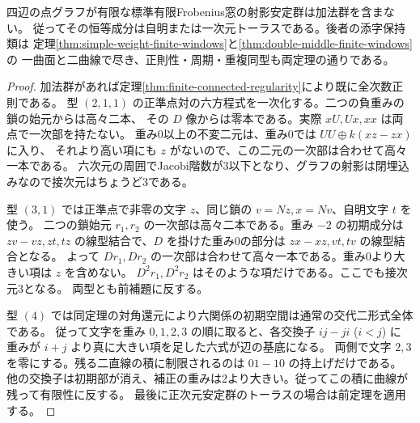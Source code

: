\begin{theorem}\label{thm:finite-no-additive}
四辺の点グラフが有限な標準有限Frobenius窓の射影安定群は加法群を含まない。
従ってその恒等成分は自明または一次元トーラスである。後者の添字保持類は
定理\ref{thm:simple-weight-finite-windows}と\ref{thm:double-middle-finite-windows}の
一曲面と二曲線で尽き、正則性・周期・重複同型も両定理の通りである。
\end{theorem}
\begin{proof}
加法群があれば定理\ref{thm:finite-connected-regularity}により既に全次数正則である。
型 $(2,1,1)$ の正準点対の六方程式を一次化する。二つの負重みの鎖の始元からは高々二本、
その $D$ 像からは零本である。実際 $xU,Ux,xx$ は両点で一次部を持たない。
重み0以上の不変二元は、重み0では $UU\oplus k(xz-zx)$ に入り、
それより高い項にも $z$ がないので、この二元の一次部は合わせて高々一本である。
六次元の周囲でJacobi階数が3以下となり、グラフの射影は閉埋込みなので接次元はちょうど3である。

型 $(3,1)$ では正準点で非零の文字 $z$、同じ鎖の $v=Nz,x=Nv$、自明文字 $t$ を使う。
二つの鎖始元 $r_1,r_2$ の一次部は高々二本である。重み $-2$ の初期成分は
$zv-vz,zt,tz$ の線型結合で、$D$ を掛けた重み0の部分は $zx-xz,vt,tv$ の線型結合となる。
よって $Dr_1,Dr_2$ の一次部は合わせて高々一本である。重み0より大きい項は $z$ を含めない。
$D^2 r_1,D^2 r_2$ はそのような項だけである。ここでも接次元3となる。
両型とも前補題に反する。

型 $(4)$ では同定理の対角還元により六関係の初期空間は通常の交代二形式全体である。
従って文字を重み $0,1,2,3$ の順に取ると、各交換子 $ij-ji$ ($i<j$) に
重みが $i+j$ より真に大きい項を足した六式が辺の基底になる。
両側で文字 $2,3$ を零にする。残る二直線の積に制限されるのは $01-10$ の持上げだけである。
他の交換子は初期部が消え、補正の重みは2より大きい。従ってこの積に曲線が残って有限性に反する。
最後に正次元安定群のトーラスの場合は前定理を適用する。
\end{proof}

